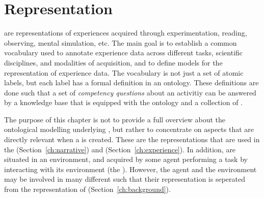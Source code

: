 
\chapter{Representation}
\label{chap:represenation}

\neems are representations of experiences acquired through experimentation, reading, observing, mental simulation, etc.
The main goal is to establish a common vocabulary used to annotate experience data across different tasks, scientific disciplines, and modalities of acquisition, and to define models for the representation of experience data.
The vocabulary is not just a set of atomic labels, but each label has a formal definition in an ontology.
These definitions are done such that a set of \emph{competency questions} about an activitiy can be answered by a knowledge base that is equipped with the ontology and a collection of \neems.

The purpose of this chapter is not to provide a full overview about the ontological modelling underlying \neems, but rather to concentrate on aspects that are directly relevant when a \neem is created.
These are the representations that are used in the \neemnar (Section~\ref{ch:narrative}) and \neemexp (Section~\ref{ch:experience}).
In addition, \neems are situated in an environment, and acquired by some agent performing a task by interacting with its environment (the \neembak).
However, the agent and the environment may be involved in many different \neems such that their representation is seperated from the representation of \neems (Section~\ref{ch:background}).


\newpage


\newpage


\newpage



